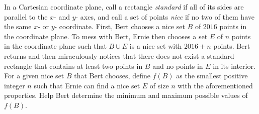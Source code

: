 In a Cartesian coordinate plane, call a rectangle \emph{standard} if all of its sides are parallel to the $x$- and $y$- axes, and call a set of points \emph{nice} if no two of them have the same $x$- or $y$- coordinate. First, Bert chooses a nice set $B$ of $2016$ points in the coordinate plane. To mess with Bert, Ernie then chooses a set $E$ of $n$ points in the coordinate plane such that $B\cup E$ is a nice set with $2016+n$ points. Bert returns and then miraculously notices that there does not exist a standard rectangle that contains at least two points in $B$ and no points in $E$ in its interior. For a given nice set $B$ that Bert chooses, define $f(B)$ as the smallest positive integer $n$ such that Ernie can find a nice set $E$ of size $n$ with the aforementioned properties. Help Bert determine the minimum and maximum possible values of $f(B)$.